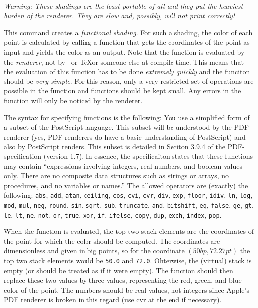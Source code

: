 \begin{command}{\pgfdeclarefunctionalshading{}\\
    }
  \emph{Warning: These shadings are the least portable of all and they
  put the heaviest burden of the renderer. They are slow and,
  possibly, will not print correctly!}

  This command creates a \emph{functional shading}. For such a
  shading, the color of each point is calculated by calling a function
  that gets the coordinates of the point as input and yields the
  color as an output. Note that the function is evaluated by the 
  \emph{renderer}, not by \pgfname\ or \TeX or someone else at
  compile-time. This means that the evaluation of this function has to
  be done \emph{extremely quickly} and the funciton should be
  \emph{very simple}. For this reason, only a very restricted set of
  operations are possible in the function and functions should be
  kept small. Any errors in the function will only be noticed by the
  renderer.

  The syntax for specifying functions is the following: You use a
  simplified form of a subset of the PostScript language. This subset
  will be understood by the PDF-renderer (yes, PDF-renderers do
  have a basic understanding of PostScript) and also by PostScript
  renders. This subset is detailed in Seciton 3.9.4 of the
  PDF-specification (version 1.7). In essence, the specificaiton
  states that these functions may contain ``expressions involving
  integers, real numbers, and boolean values only. There are no
  composite data structures such as strings or arrays, no procedures,
  and no variables or names.'' The allowed operators are (exactly) the
  following: \texttt{abs}, \texttt{add}, \texttt{atan},
  \texttt{ceiling}, \texttt{cos}, \texttt{cvi}, \texttt{cvr},
  \texttt{div}, \texttt{exp}, \texttt{floor}, \texttt{idiv},
  \texttt{ln}, \texttt{log}, \texttt{mod}, \texttt{mul}, \texttt{neg},
  \texttt{round}, \texttt{sin}, \texttt{sqrt}, \texttt{sub},
  \texttt{truncate}, \texttt{and}, \texttt{bitshift}, \texttt{eq},
  \texttt{false}, \texttt{ge}, \texttt{gt}, \texttt{le}, \texttt{lt},
  \texttt{ne}, \texttt{not}, \texttt{or}, \texttt{true}, \texttt{xor},
  \texttt{if}, \texttt{ifelse}, \texttt{copy}, \texttt{dup},
  \texttt{exch}, \texttt{index}, \texttt{pop}.

  When the function is evaluated, the top two stack elements are the
  coordinates of the point for which the color should be computed. The
  coordinates are dimensionless and given in big points, so for the
  coordinate $(50bp, 72.27pt)$ the top two stack elements would be
  \texttt{50.0} and \texttt{72.0}. Ohterwise, the (virtual) stack is
  empty (or should be treated as if it were empty). The function
  should then replace these two values by three values, representing
  the red, green, and blue color of the point. The numbers should be
  real values, not integers since Apple's PDF renderer is broken in
  this regard (use cvr at the end if necessary).


\end{command}
